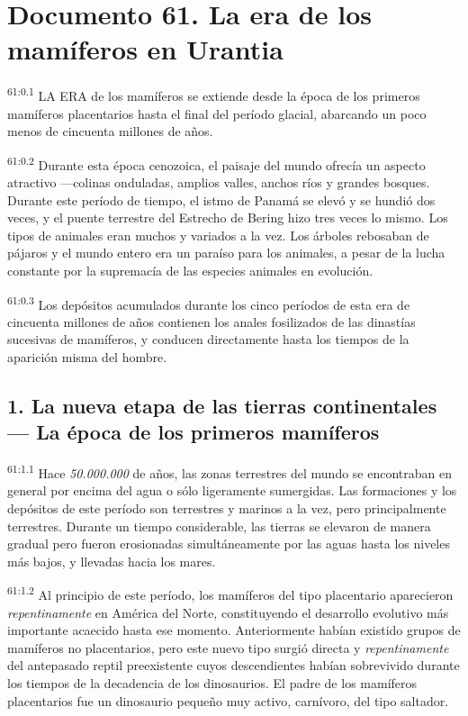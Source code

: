 \chapter{Documento 61. La era de los mamíferos en Urantia}
\par
\textsuperscript{61:0.1} LA ERA de los mamíferos se extiende desde la época de los primeros mamíferos placentarios hasta el final del período glacial, abarcando un poco menos de cincuenta millones de años.

\par
\textsuperscript{61:0.2} Durante esta época cenozoica, el paisaje del mundo ofrecía un aspecto atractivo ---colinas onduladas, amplios valles, anchos ríos y grandes bosques. Durante este período de tiempo, el istmo de Panamá se elevó y se hundió dos veces, y el puente terrestre del Estrecho de Bering hizo tres veces lo mismo. Los tipos de animales eran muchos y variados a la vez. Los árboles rebosaban de pájaros y el mundo entero era un paraíso para los animales, a pesar de la lucha constante por la supremacía de las especies animales en evolución.

\par
\textsuperscript{61:0.3} Los depósitos acumulados durante los cinco períodos de esta era de cincuenta millones de años contienen los anales fosilizados de las dinastías sucesivas de mamíferos, y conducen directamente hasta los tiempos de la aparición misma del hombre.

\section*{1. La nueva etapa de las tierras continentales --- La época de los primeros mamíferos}
\par
\textsuperscript{61:1.1} Hace \textit{50.000.000} de años, las zonas terrestres del mundo se encontraban en general por encima del agua o sólo ligeramente sumergidas. Las formaciones y los depósitos de este período son terrestres y marinos a la vez, pero principalmente terrestres. Durante un tiempo considerable, las tierras se elevaron de manera gradual pero fueron erosionadas simultáneamente por las aguas hasta los niveles más bajos, y llevadas hacia los mares.

\par
\textsuperscript{61:1.2} Al principio de este período, los mamíferos del tipo placentario aparecieron \textit{repentinamente} en América del Norte, constituyendo el desarrollo evolutivo más importante acaecido hasta ese momento. Anteriormente habían existido grupos de mamíferos no placentarios, pero este nuevo tipo surgió directa y \textit{repentinamente} del antepasado reptil preexistente cuyos descendientes habían sobrevivido durante los tiempos de la decadencia de los dinosaurios. El padre de los mamíferos placentarios fue un dinosaurio pequeño muy activo, carnívoro, del tipo saltador.

